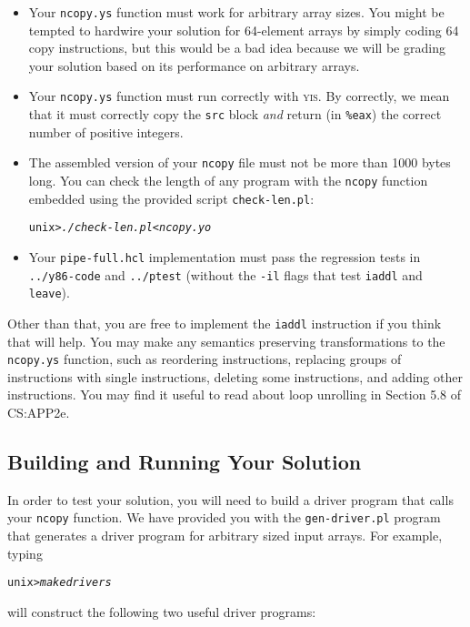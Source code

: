 \documentclass[11pt]{article}
\newenvironment{tty}%
{\small\begin{alltt}}%
{\end{alltt}}
\begin{document}
\begin{itemize}
\item Your \texttt{ncopy.ys} function must work for arbitrary array
sizes. You might be tempted to hardwire your solution for 64-element
arrays by simply coding 64 copy instructions, but this would be a bad
idea because we will be grading your solution based on its performance
on arbitrary arrays.

\item Your \texttt{ncopy.ys} function must run correctly with \textsc{yis}.
By correctly, we mean that it must correctly copy the \texttt{src} block
{\em and} return (in \texttt{\%eax}) the correct number of positive integers.

\item The assembled version of your \texttt{ncopy} file must not be
more than 1000 bytes long.  You can check the length of any program
with the \texttt{ncopy} function embedded using the provided script
\texttt{check-len.pl}:
\begin{tty}
unix> {\em ./check-len.pl < ncopy.yo}
\end{tty}

\item Your \texttt{pipe-full.hcl} implementation must pass the 
regression tests in \texttt{../y86-code} and \texttt{../ptest}
(without the \texttt{-il} flags that test {\tt iaddl} and {\tt
leave}).
\end{itemize}

Other than that, you are free to implement the {\tt iaddl} instruction
if you think that will help.  You may make any semantics preserving transformations to
the {\tt ncopy.ys} function, such as reordering instructions, replacing
groups of instructions with single instructions, deleting some
instructions, and adding other instructions.
You may find it useful to read about loop unrolling in Section 5.8 of CS:APP2e.

\subsection*{Building and Running Your Solution}

In order to test your solution, you will need to build a driver
program that calls your \texttt{ncopy} function.  We have provided you
with the \texttt{gen-driver.pl} program that generates a driver
program for arbitrary sized input arrays. For example, typing

\begin{tty}
unix> {\em make drivers}
\end{tty}
will construct the following two useful driver programs:
\end{document}
